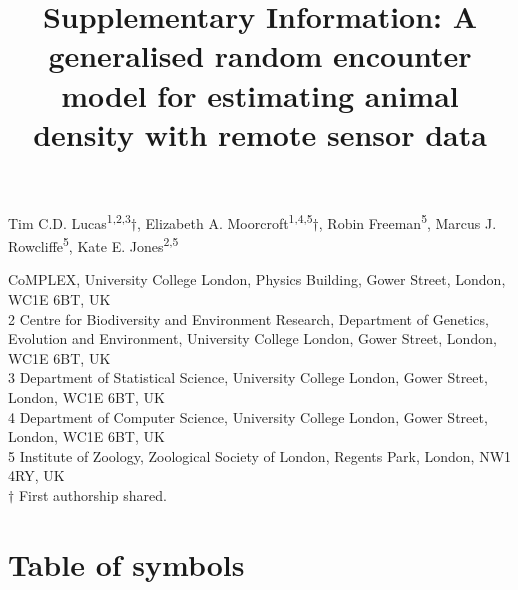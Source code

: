\documentclass[a4paper,10pt,reqno,oneside]{amsart}
\begin{document}
\title[Supp. Info, Lucas \emph{et al.}: A generalised random encounter model for animals]{Supplementary Information: A generalised random encounter model for estimating animal density with remote sensor data}
\maketitle


%

\noindent Tim C.D. Lucas\textsuperscript{1,2,3}$\dagger$, Elizabeth A. Moorcroft\textsuperscript{1,4,5}$\dagger$, Robin Freeman\textsuperscript{5}, Marcus J. Rowcliffe\textsuperscript{5}, Kate E. Jones\textsuperscript{2,5}\\



 CoMPLEX, University College London, Physics Building, Gower Street, London, WC1E 6BT, UK\\ 
2 Centre for Biodiversity and Environment Research, Department of Genetics, Evolution and Environment, University College London, Gower Street, London, WC1E 6BT, UK\\ 
3 Department of Statistical Science, University College London, Gower Street, London, WC1E 6BT, UK\\ 
4 Department of Computer Science, University College London, Gower Street, London, WC1E 6BT, UK\\ 
5 Institute of Zoology, Zoological Society of London, Regents Park, London, NW1 4RY, UK\\
$\dagger$ First authorship shared. 

\clearpage
\section{Table of symbols}
\end{document}
